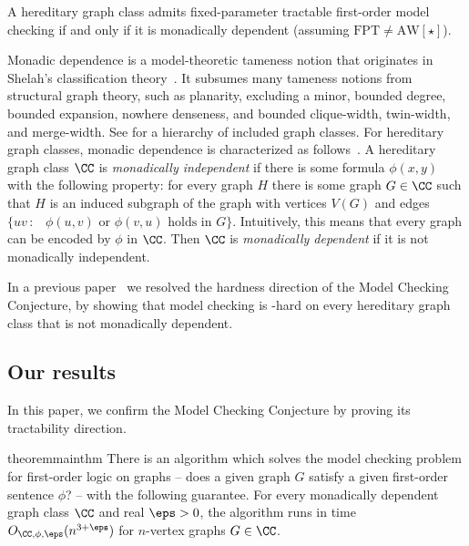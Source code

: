 \begin{mcconjecture}\label{conj:main2}
  A hereditary graph class admits fixed-parameter tractable first-order model checking if and only if it is monadically dependent (assuming $\mathrm{FPT}{\neq}\mathrm{AW}[\star]$).
\end{mcconjecture}

Monadic dependence is a model-theoretic tameness notion that originates in Shelah's classification theory~\cite{BS1985monadic}.
It subsumes many tameness notions from structural graph theory, such as planarity, excluding a minor, bounded degree, bounded expansion, nowhere denseness, and bounded clique-width, twin-width, and merge-width.
See  for a hierarchy of included graph classes.
For hereditary graph classes, monadic dependence is characterized as follows~\cite{flip-breakability}.
A hereditary graph class $\CC$ is \emph{monadically independent} if there is some formula $\phi(x,y)$ with the following property: for every graph \(H\) there is some graph $G \in \CC$
such that $H$ is an induced subgraph of the graph with vertices $V(G)$ and edges \(\{ uv \,:\, \text{ $\phi(u,v)$ or $\phi(v,u)$ holds in $G$} \}\).
Intuitively, this means that every graph can be encoded by $\phi$ in $\CC$.
Then $\CC$ is \emph{monadically dependent} if it is not monadically independent.

\medskip
In a previous paper~\cite{flip-breakability} we resolved the hardness direction of the Model Checking Conjecture, by showing that model checking is
\AWstar-hard on every hereditary graph class that is not monadically dependent.

\subsection{Our results}
In this paper, we confirm the Model Checking Conjecture by proving its tractability direction.

\begin{restatable}{theorem}{mainthm}\label{thm:main}
  There is an algorithm which
  solves the model checking problem for first-order logic on graphs --
  does a given graph $G$ satisfy a given first-order sentence $\phi$?  -- with the following guarantee.
  For every monadically dependent graph class $\CC$ and real $\eps>0$, the algorithm runs in time $O_{\CC,\phi,\eps}(n^{3+\eps})$ for $n$-vertex graphs $G\in\CC$.
\end{restatable}

